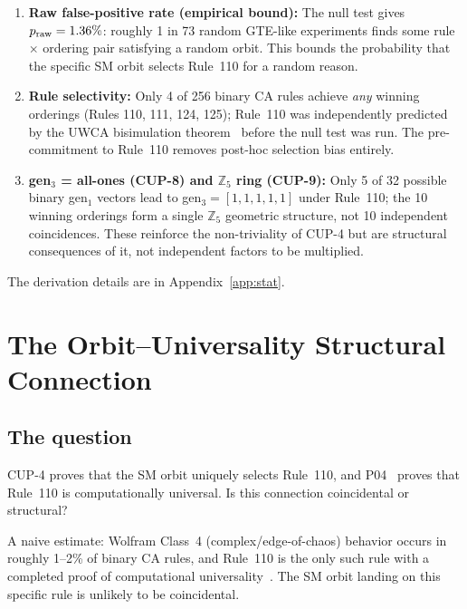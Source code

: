 \documentclass[11pt]{article}
\theoremstyle{remark}
\begin{document}
\begin{enumerate}
\item \textbf{Raw false-positive rate (empirical bound):}
The null test gives $p_{\rm raw} = 1.36\%$: roughly 1 in 73 random GTE-like experiments
finds some rule $\times$ ordering pair satisfying a random orbit.
This bounds the probability that the specific SM orbit selects Rule~110 for a random reason.

\item \textbf{Rule selectivity:} Only 4 of 256 binary CA rules achieve \emph{any}
winning orderings (Rules 110, 111, 124, 125); Rule~110 was independently predicted
by the UWCA bisimulation theorem~\cite{Spivack2025_UGPDynamicsUniversality} before the null test was run.
The pre-commitment to Rule~110 removes post-hoc selection bias entirely.

\item \textbf{gen$_3$ = all-ones (CUP-8) and $\mathbb{Z}_5$ ring (CUP-9):}
Only 5 of 32 possible binary gen$_1$ vectors lead to gen$_3 = [1,1,1,1,1]$ under Rule~110;
the 10 winning orderings form a single $\mathbb{Z}_5$ geometric structure, not 10
independent coincidences.
These reinforce the non-triviality of CUP-4 but are structural consequences of it,
not independent factors to be multiplied.
\end{enumerate}

The derivation details are in Appendix~\ref{app:stat}.

\section{The Orbit--Universality Structural Connection}
\label{sec:structural}

\subsection{The question}

CUP-4 proves that the SM orbit uniquely selects Rule~110, and P04~\cite{Spivack2025_UGPDynamicsUniversality} proves that Rule~110
is computationally universal. Is this connection coincidental or structural?

A naive estimate: Wolfram Class~4 (complex/edge-of-chaos) behavior occurs in roughly
1--2\% of binary CA rules, and Rule~110 is the only such rule with a completed proof of
computational universality~\cite{Cook2004,Cook2009}. The SM orbit landing on this specific
rule is unlikely to be coincidental.
\end{document}
